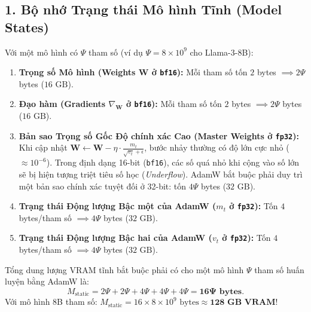 \subsection{1. Bộ nhớ Trạng thái Mô hình Tĩnh (Model States)}
Với một mô hình có $\Psi$ tham số (ví dụ $\Psi = 8 \times 10^9$ cho Llama-3-8B):
\begin{enumerate}[leftmargin=1.2cm]
    \item \textbf{Trọng số Mô hình (Weights $\mathbf{W}$ ở \texttt{bf16}):} Mỗi tham số tốn $2$ bytes $\implies 2\Psi$ bytes ($16\text{ GB}$).
    \item \textbf{Đạo hàm (Gradients $\nabla_{\mathbf{W}}$ ở \texttt{bf16}):} Mỗi tham số tốn $2$ bytes $\implies 2\Psi$ bytes ($16\text{ GB}$).
    \item \textbf{Bản sao Trọng số Gốc Độ chính xác Cao (Master Weights ở \texttt{fp32}):} Khi cập nhật $\mathbf{W} \leftarrow \mathbf{W} - \eta \cdot \frac{m_t}{\sqrt{v_t} + \epsilon}$, bước nhảy thường có độ lớn cực nhỏ ($\approx 10^{-6}$). Trong định dạng 16-bit (\texttt{bf16}), các số quá nhỏ khi cộng vào số lớn sẽ bị hiện tượng triệt tiêu số học (\textit{Underflow}). AdamW bắt buộc phải duy trì một bản sao chính xác tuyệt đối ở 32-bit: tốn $4\Psi$ bytes ($32\text{ GB}$).
    \item \textbf{Trạng thái Động lượng Bậc một của AdamW ($m_t$ ở \texttt{fp32}):} Tốn $4$ bytes/tham số $\implies 4\Psi$ bytes ($32\text{ GB}$).
    \item \textbf{Trạng thái Động lượng Bậc hai của AdamW ($v_t$ ở \texttt{fp32}):} Tốn $4$ bytes/tham số $\implies 4\Psi$ bytes ($32\text{ GB}$).
\end{enumerate}

\begin{theorem}
Tổng dung lượng VRAM tĩnh bắt buộc phải có cho một mô hình $\Psi$ tham số huấn luyện bằng AdamW là:
\begin{equation}
    M_{\text{static}} = 2\Psi + 2\Psi + 4\Psi + 4\Psi + 4\Psi = \mathbf{16\Psi \text{ bytes}}.
    \label{eq:static_memory}
\end{equation}
Với mô hình 8B tham số: $M_{\text{static}} = 16 \times 8 \times 10^9 \text{ bytes} \approx \mathbf{128\text{ GB VRAM}}$!
\end{theorem}

